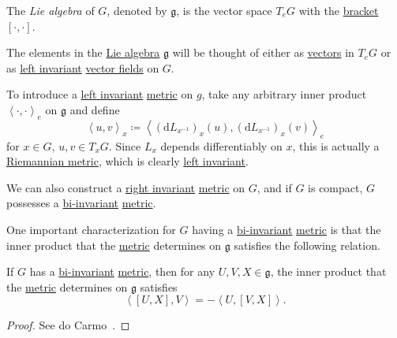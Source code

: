 \begin{definition}\label{def:Lie-algebra}
	The \emph{Lie algebra} of \(G\), denoted by \(\mathfrak{g}\), is the vector space \(T_e G\) with the \hyperref[def:bracket]{bracket} \([\cdot, \cdot]\).
\end{definition}

\begin{note}
	The elements in the \hyperref[def:Lie-algebra]{Lie algebra} \(\mathfrak{g}\) will be thought of either as \hyperref[def:tangent-vector]{vectors} in \(T_e G\) or as \hyperref[def:vector-field-left-invariant]{left invariant} \hyperref[def:vector-field]{vector fields} on \(G\).
\end{note}

To introduce a \hyperref[def:Riemannian-metric-left-invariant]{left invariant} \hyperref[def:Riemannian-metric]{metric} on \(g\), take any arbitrary inner product \(\left\langle \cdot, \cdot \right\rangle _e\) on \(\mathfrak{g} \) and define
\begin{equation}\label{eq:inner-product-on-Lie-algebra}
	\left\langle u, v \right\rangle _x \coloneqq \left\langle (\mathrm{d} L_{x ^{-1} })_x(u), (\mathrm{d} L_{x ^{-1} })_x(v) \right\rangle _e
\end{equation}
for \(x\in G\), \(u, v\in T_x G\). Since \(L_x\) depends differentiably on \(x\), this is actually a \hyperref[def:Riemannian-metric]{Riemannian metric}, which is clearly \hyperref[def:Riemannian-metric-left-invariant]{left invariant}.

\begin{remark}
	We can also construct a \hyperref[def:Riemannian-metric-right-invariant]{right invariant} \hyperref[def:Riemannian-metric]{metric} on \(G\), and if \(G\) is compact, \(G\) possesses a \hyperref[def:Riemannian-metric-left-invariant]{bi-invariant} \hyperref[def:Riemannian-metric]{metric}.
\end{remark}

One important characterization for \(G\) having a \hyperref[def:Riemannian-metric-left-invariant]{bi-invariant} \hyperref[def:Riemannian-metric]{metric} is that the inner product that the \hyperref[def:Riemannian-metric]{metric} determines on \(\mathfrak{g} \) satisfies the following relation.

\begin{proposition}
	If \(G\) has a \hyperref[def:Riemannian-metric-left-invariant]{bi-invariant} \hyperref[def:Riemannian-metric]{metric}, then for any \(U, V, X\in \mathfrak{g} \), the inner product that the \hyperref[def:Riemannian-metric]{metric} determines on \(\mathfrak{g} \) satisfies
	\[
		\left\langle [U, X], V \right\rangle = -\left\langle U, [V, X] \right\rangle.
	\]
\end{proposition}
\begin{proof}
	See do Carmo~\cite[Page 40, 41]{flaherty2013riemannian}.
\end{proof}

